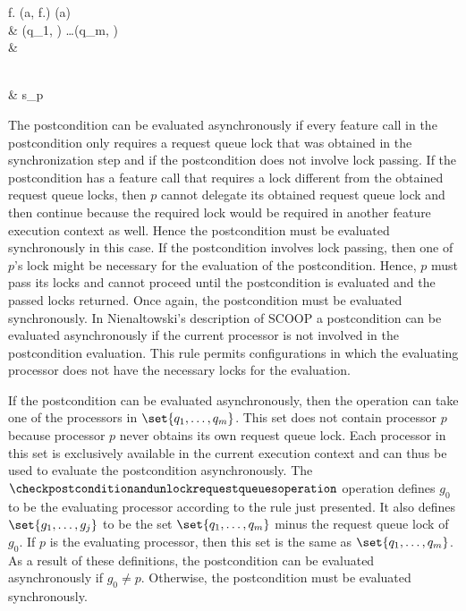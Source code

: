 \begin{forjournal}
{{{\begin{split}
							\multilineconditionaloperation
								{f.\postconditionexistsfeature}
								{\evaluateoperation(a, f.\postconditionfeature) \statementseparator \waitoperation(a)}
								{\nooperation} \statementseparator \\
							& \issueoperation(q_{1}, \unlockrequestqueueoperation) \statementseparator \ldots \statementseparator \issueoperation(q_{m}, \unlockrequestqueueoperation) \statementseparator \\
							& \popobtainedrequestqueuelocksoperation
						\end{split}
					} \statementseparator \\
				& s_{p}
			}
			{\state}
	}
 \end{forjournal}

\begin{clarification}
The postcondition can be evaluated asynchronously if every feature call in the postcondition only requires a request queue lock that was obtained in the synchronization step and if the postcondition does not involve lock passing. If the postcondition has a feature call that requires a lock different from the obtained request queue locks, then $p$ cannot delegate its obtained request queue lock and then continue because the required lock would be required in another feature execution context as well. Hence the postcondition must be evaluated synchronously in this case. If the postcondition involves lock passing, then one of $p$'s lock might be necessary for the evaluation of the postcondition. Hence, $p$ must pass its locks and cannot proceed until the postcondition is evaluated and the passed locks returned. Once again, the postcondition must be evaluated synchronously. In Nienaltowski's description of SCOOP \cite{nienaltowski:2007:SCOOP} a postcondition can be evaluated asynchronously if the current processor is not involved in the postcondition evaluation. This rule permits configurations in which the evaluating processor does not have the necessary locks for the evaluation.
\end{clarification}

If the postcondition can be evaluated asynchronously, then the operation can take one of the processors in $\set{q_{1}, \ldots, q_{m}}$. This set does not contain processor $p$ because processor $p$ never obtains its own request queue lock. Each processor in this set is exclusively available in the current execution context and can thus be used to evaluate the postcondition asynchronously. The $\checkpostconditionandunlockrequestqueuesoperation$ operation defines $g_{0}$ to be the evaluating processor according to the rule just presented. It also defines $\set{g_{1}, \ldots, g_{j}}$ to be the set $\set{q_{1}, \ldots, q_{m}}$ minus the request queue lock of $g_{0}$. If $p$ is the evaluating processor, then this set is the same as $\set{q_{1}, \ldots, q_{m}}$. As a result of these definitions, the postcondition can be evaluated asynchronously if $g_{0} \neq p$. Otherwise, the postcondition must be evaluated synchronously.

